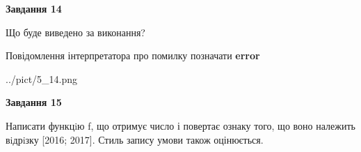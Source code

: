 \documentclass[11pt, ukrainian]{article}
\begin{document}
{\begin {large}
{\begin {center}\textbf{Завдання 14}\end {center}}\par
Що буде виведено за виконання? \par
Повідомлення інтерпретатора про помилку позначати \textbf{error}

\begin{center}
	{../pict/5_14.png}
\end{center}
\newpage

{\begin {center}\textbf{Завдання 15}\end {center}}\par

Написати функцiю f, що отримує число і повертає ознаку того, що воно належить вiдрiзку [2016; 2017]. Стиль запису умови також оцінюється.\par
\newpage

\end {large}}
\end{document}
